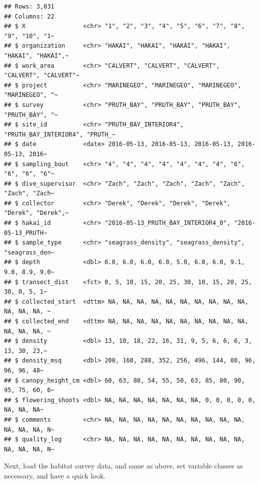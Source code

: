 \documentclass[
]{book}
\begin{document}
\begin{verbatim}
## Rows: 3,031
## Columns: 22
## $ X                <chr> "1", "2", "3", "4", "5", "6", "7", "8", "9", "10", "1~
## $ organization     <chr> "HAKAI", "HAKAI", "HAKAI", "HAKAI", "HAKAI", "HAKAI",~
## $ work_area        <chr> "CALVERT", "CALVERT", "CALVERT", "CALVERT", "CALVERT"~
## $ project          <chr> "MARINEGEO", "MARINEGEO", "MARINEGEO", "MARINEGEO", "~
## $ survey           <chr> "PRUTH_BAY", "PRUTH_BAY", "PRUTH_BAY", "PRUTH_BAY", "~
## $ site_id          <chr> "PRUTH_BAY_INTERIOR4", "PRUTH_BAY_INTERIOR4", "PRUTH_~
## $ date             <date> 2016-05-13, 2016-05-13, 2016-05-13, 2016-05-13, 2016~
## $ sampling_bout    <chr> "4", "4", "4", "4", "4", "4", "4", "6", "6", "6", "6"~
## $ dive_supervisor  <chr> "Zach", "Zach", "Zach", "Zach", "Zach", "Zach", "Zach~
## $ collector        <chr> "Derek", "Derek", "Derek", "Derek", "Derek", "Derek",~
## $ hakai_id         <chr> "2016-05-13_PRUTH_BAY_INTERIOR4_0", "2016-05-13_PRUTH~
## $ sample_type      <chr> "seagrass_density", "seagrass_density", "seagrass_den~
## $ depth            <dbl> 6.0, 6.0, 6.0, 6.0, 5.0, 6.0, 6.0, 9.1, 9.0, 8.9, 9.0~
## $ transect_dist    <fct> 0, 5, 10, 15, 20, 25, 30, 10, 15, 20, 25, 30, 0, 5, 1~
## $ collected_start  <dttm> NA, NA, NA, NA, NA, NA, NA, NA, NA, NA, NA, NA, NA, ~
## $ collected_end    <dttm> NA, NA, NA, NA, NA, NA, NA, NA, NA, NA, NA, NA, NA, ~
## $ density          <dbl> 13, 10, 18, 22, 16, 31, 9, 5, 6, 6, 6, 3, 13, 30, 23,~
## $ density_msq      <dbl> 208, 160, 288, 352, 256, 496, 144, 80, 96, 96, 96, 48~
## $ canopy_height_cm <dbl> 60, 63, 80, 54, 55, 50, 63, 85, 80, 90, 95, 75, 60, 6~
## $ flowering_shoots <dbl> NA, NA, NA, NA, NA, NA, NA, 0, 0, 0, 0, 0, NA, NA, NA~
## $ comments         <chr> NA, NA, NA, NA, NA, NA, NA, NA, NA, NA, NA, NA, NA, N~
## $ quality_log      <chr> NA, NA, NA, NA, NA, NA, NA, NA, NA, NA, NA, NA, NA, N~
\end{verbatim}

Next, load the habitat survey data, and same as above, set variable classes as necessary,
and have a quick look.
\end{document}
